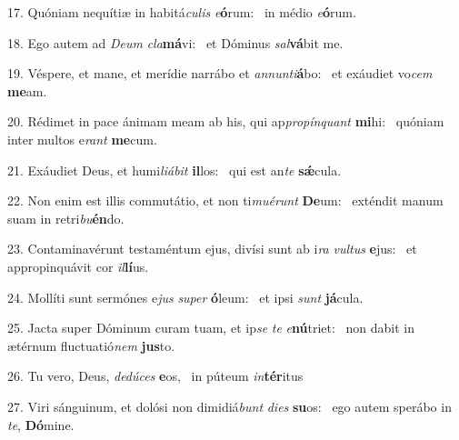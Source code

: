 17. Quóniam nequítiæ in habitá\textit{cu}\textit{lis} \textit{e}\textbf{ó}rum: \ast\  in médio \textit{e}\textbf{ó}rum.\

18. Ego autem ad \textit{De}\textit{um} \textit{cla}\textbf{má}vi: \ast\  et Dóminus \textit{sal}\textbf{vá}bit me.\

19. Véspere, et mane, et merídie narrábo et \textit{an}\textit{nun}\textit{ti}\textbf{á}bo: \ast\  et exáudiet vo\textit{cem} \textbf{me}am.\

20. Rédimet in pace ánimam meam ab his, qui ap\textit{pro}\textit{pín}\textit{quant} \textbf{mi}hi: \ast\  quóniam inter multos e\textit{rant} \textbf{me}cum.\

21. Exáudiet Deus, et humi\textit{li}\textit{á}\textit{bit} \textbf{il}los: \ast\  qui est an\textit{te} \textbf{sǽ}cula.\

22. Non enim est illis commutátio, et non ti\textit{mu}\textit{é}\textit{runt} \textbf{De}um: \ast\  exténdit manum suam in retri\textit{bu}\textbf{én}do.\

23. Contaminavérunt testaméntum ejus, divísi sunt ab i\textit{ra} \textit{vul}\textit{tus} \textbf{e}jus: \ast\  et appropinquávit cor \textit{il}\textbf{lí}us.\

24. Mollíti sunt sermónes e\textit{jus} \textit{su}\textit{per} \textbf{ó}leum: \ast\  et ipsi \textit{sunt} \textbf{já}cula.\

25. Jacta super Dóminum curam tuam, et ip\textit{se} \textit{te} \textit{e}\textbf{nú}triet: \ast\  non dabit in ætérnum fluctuatió\textit{nem} \textbf{jus}to.\

26. Tu vero, Deus, \textit{de}\textit{dú}\textit{ces} \textbf{e}os, \ast\  in púteum \textit{in}\textbf{tér}itus\

27. Viri sánguinum, et dolósi non dimidiá\textit{bunt} \textit{di}\textit{es} \textbf{su}os: \ast\  ego autem sperábo in \textit{te}, \textbf{Dó}mine.\

